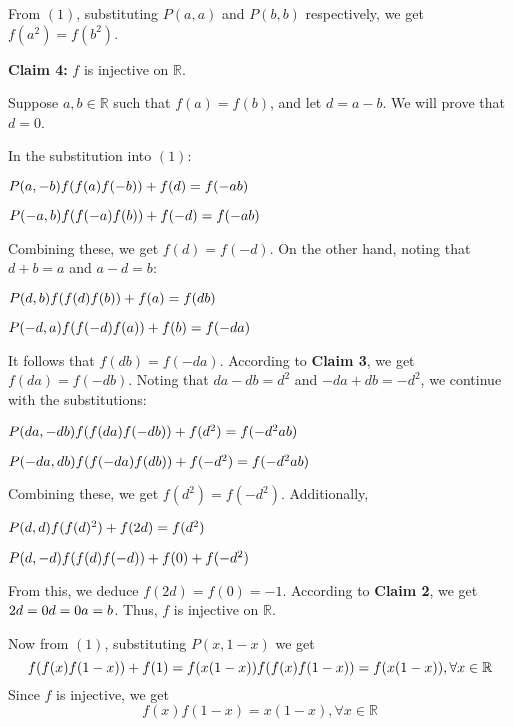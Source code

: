 \documentclass[11pt]{scrartcl}
\begin{document}
\begin{itemize}[label=, leftmargin=0em, itemsep=0.2em]
\begin{sol}
\begin{pro}
            From \((1)\), substituting \( P(a,a) \) and \( P(b,b) \) respectively, we get \( f(a^2) = f(b^2) \).
            \end{pro}
            \textbf{Claim 4:} \( f \) is injective on \(\mathbb{R}\).
            \begin{pro}
            Suppose \( a, b \in \mathbb{R} \) such that \( f(a) = f(b) \), and let \( d = a - b \). We will prove that \( d = 0 \). 
            
            In the substitution into \((1)\):
            
            \( P(a, -b) \ra f(f(a)f(-b)) + f(d) = f(-ab) \)
            
            \( P(-a, b) \ra f(f(-a)f(b)) + f(-d) = f(-ab) \)
            
            Combining these, we get \( f(d) = f(-d) \). 
            On the other hand, noting that \( d + b = a \) and \( a - d = b \):
            
            \( P(d, b) \ra f(f(d)f(b)) + f(a) = f(db) \)
            
            \( P(-d, a) \ra f(f(-d)f(a)) + f(b) = f(-da) \)
            
            It follows that \( f(db) = f(-da) \). According to \textbf{Claim 3}, we get \( f(da) = f(-db) \). Noting that \( da - db = d^2 \) and \( -da + db = -d^2 \), we continue with the substitutions:
            
            \( P(da, -db) \ra f(f(da)f(-db)) + f(d^2) = f(-d^2ab) \)
            
            \( P(-da, db) \ra f(f(-da)f(db)) + f(-d^2) = f(-d^2ab) \)
            
            Combining these, we get \( f(d^2) = f(-d^2) \). Additionally,
            
            \( P(d, d) \ra f(f(d)^2) + f(2d) = f(d^2) \)
            
            \( P(d, -d) \ra f(f(d)f(-d)) + f(0) + f(-d^2) \)
            
            From this, we deduce \( f(2d) = f(0) = -1 \). According to \textbf{Claim 2}, we get \( 2d = 0 \ra d = 0 \ra a = b \). Thus, \( f \) is injective on \(\mathbb{R}\).
            \end{pro}
            
            Now from \((1)\), substituting \( P(x, 1 - x) \) we get
            \[
            f(f(x)f(1-x)) + f(1) = f(x(1-x)) \ra f(f(x)f(1 - x)) = f(x(1-x)), \forall x \in \mathbb{R}
            \]
            Since \( f \) is injective, we get 
            \[f(x)f(1-x) = x(1-x), \forall x \in \mathbb{R} \tag{3}\]
            

\end{sol}
\end{itemize}
\end{document}
